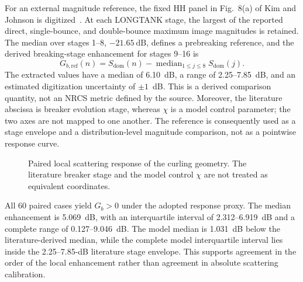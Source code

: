 For an external magnitude reference, the fixed HH panel in Fig.~8(a) of Kim and Johnson is digitized~\cite{kim2002breakingwave}. At each LONGTANK stage, the largest of the reported direct, single-bounce, and double-bounce maximum image magnitudes is retained. The median over stages 1--8, $-21.65~\mathrm{dB}$, defines a prebreaking reference, and the derived breaking-stage enhancement for stages 9--16 is
\begin{equation}
G_{b,\mathrm{ref}}(n)=S_{\mathrm{dom}}(n)-\operatorname{median}_{1\leq j\leq8}S_{\mathrm{dom}}(j).
\label{eq:literature_breaker_gain}
\end{equation}
The extracted values have a median of 6.10~dB, a range of 2.25--7.85~dB, and an estimated digitization uncertainty of $\pm1$~dB. This is a derived comparison quantity, not an NRCS metric defined by the source. Moreover, the literature abscissa is breaker evolution stage, whereas $\chi$ is a model control parameter; the two axes are not mapped to one another. The reference is consequently used as a stage envelope and a distribution-level magnitude comparison, not as a pointwise response curve.

\begin{figure}[!t]
\centering
{}
\caption{Paired local scattering response of the curling geometry. The literature breaker stage and the model control $\chi$ are not treated as equivalent coordinates.}
\label{fig:local_electromagnetic_validation}
\end{figure}

All 60 paired cases yield $G_b>0$ under the adopted response proxy. The median enhancement is 5.069~dB, with an interquartile interval of 2.312--6.919~dB and a complete range of 0.127--9.046~dB. The model median is 1.031~dB below the literature-derived median, while the complete model interquartile interval lies inside the 2.25--7.85-dB literature stage envelope. This supports agreement in the order of the local enhancement rather than agreement in absolute scattering calibration.

